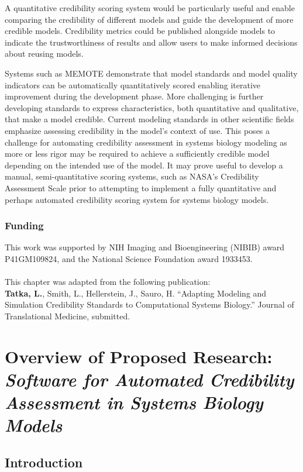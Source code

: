 \documentclass[12pt]{report}
\begin{document}
A quantitative credibility scoring system would be particularly useful and enable comparing the credibility of different models and guide the development of more credible models. Credibility metrics could be published alongside models to indicate the trustworthiness of results and allow users to make informed decisions about reusing models.


Systems such as MEMOTE demonstrate that model standards and model quality indicators can be automatically quantitatively scored enabling iterative improvement during the development phase. More challenging is further developing standards to express characteristics, both quantitative and qualitative, that make a model credible. Current modeling standards in other scientific fields emphasize assessing credibility in the model's context of use. This poses a challenge for automating credibility assessment in systems biology modeling as more or less rigor may be required to achieve a sufficiently credible model depending on the intended use of the model. It may prove useful to develop a manual, semi-quantitative scoring systems, such as NASA's Credibility Assessment Scale prior to attempting to implement a fully quantitative and perhaps automated credibility scoring system for systems biology models.

\subsection*{Funding}
This work was supported by NIH Imaging and Bioengineering (NIBIB) award P41GM109824, and the National Science Foundation award 1933453. 
\\
\\
This chapter was adapted from the following publication:\\
\textbf{Tatka, L.}, Smith, L., Hellerstein, J., Sauro, H. “Adapting Modeling and Simulation Credibility Standards to Computational Systems Biology.”   Journal of Translational Medicine, submitted.

\chapter{Overview of Proposed Research:\\\textit{Software for Automated Credibility Assessment in Systems Biology Models}}

\section{Introduction}
\end{document}
